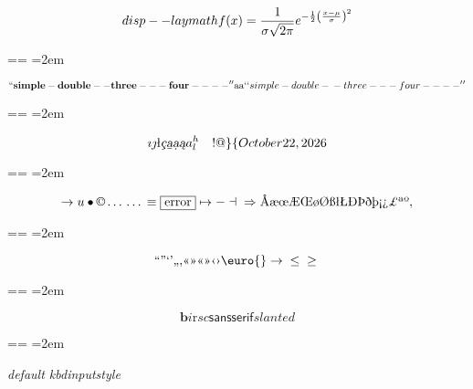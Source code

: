 \documentclass{book}
\makeatletter
\newcommand\GNUTexinfocommandstyletextkbd[1]{{\ttfamily\textsl{#1}}}%
\newenvironment{GNUTexinfopreformatted}{%
  \par\obeylines\obeyspaces\frenchspacing
  \parskip=\z@\parindent=\z@}{}
\makeatother
\begin{document}
$$
disp--laymath
f(x) = {1 \over \sigma \sqrt{2\pi}}e^{-{1 \over 2}\left({x-\mu \over \sigma}\right)^2}
$$
\begin{GNUTexinfopreformatted}
\leftskip=2em\relax\ttfamily%

\end{GNUTexinfopreformatted}
$$
\mathbf{``simple-double--three---four----''} \hbox{aa}
`\hbox{}`simple-double-\hbox{}-three---four----'\hbox{}'
$$
\begin{GNUTexinfopreformatted}
\leftskip=2em\relax\ttfamily%

\end{GNUTexinfopreformatted}
$$
\imath{} \jmath{}
\mathord{\text{\l{}}} \textsl{\c{c}}
\textsl{\b{a}} \textsl{\d{a}} \textsl{\k{a}} a^{h}_{l}
 \ {}\ {} \ {}\-{}  ! @ \} \{ 
\today{}
$$
\begin{GNUTexinfopreformatted}
\leftskip=2em\relax\ttfamily%

\end{GNUTexinfopreformatted}
$$
\rightarrow{}
u
\bullet{} \copyright{} \dots{} \dots{} \equiv{}
\fbox{error} \mapsto{} - \dashv{} \Rightarrow{}
\mathord{\text{\AA{}}} \mathord{\text{\ae{}}} \mathord{\text{\oe{}}} \mathord{\text{\AE{}}} \mathord{\text{\OE{}}} \mathord{\text{\o{}}} \mathord{\text{\O{}}} \mathord{\text{\ss{}}} \mathord{\text{\l{}}} \mathord{\text{\L{}}} \mathord{\text{\DH{}}}
\mathord{\text{\TH{}}} \mathord{\text{\dh{}}} \mathord{\text{\th{}}} \mathord{\text{\textexclamdown{}}} \mathord{\text{\textquestiondown{}}} \mathsterling{}
\mathord{\text{\textordfeminine{}}} \mathord{\text{\textordmasculine{}}} , 
$$
\begin{GNUTexinfopreformatted}
\leftskip=2em\relax\ttfamily%

\end{GNUTexinfopreformatted}
$$
\mathord{\text{\textquotedblleft{}}} \mathord{\text{\textquotedblright{}}} 
\mathord{\text{\textquoteleft{}}} \mathord{\text{\textquoteright{}}} \mathord{\text{\quotedblbase{}}} \mathord{\text{\quotesinglbase{}}} \mathord{\text{\guillemotleft{}}}
\mathord{\text{\guillemotright{}}} \mathord{\text{\guillemotleft{}}} \mathord{\text{\guillemotright{}}} \mathord{\text{\guilsinglleft{}}}
\mathord{\text{\guilsinglright{}}} \euro{} \rightarrow{} \leq{} \geq{}
$$
\begin{GNUTexinfopreformatted}
\leftskip=2em\relax\ttfamily%

\end{GNUTexinfopreformatted}
$$
\mathbf{b} \mathit{i} \mathrm{r} sc \mathsf{sansserif} slanted
$$
\begin{GNUTexinfopreformatted}
\leftskip=2em\relax\ttfamily%

\GNUTexinfocommandstyletextkbd{default kbdinputstyle}
\end{GNUTexinfopreformatted}
\end{document}
